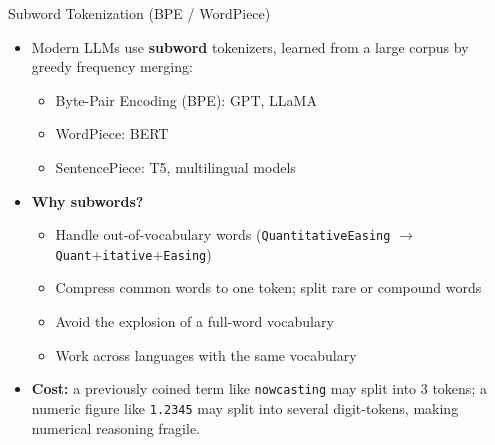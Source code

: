 \begin{frame}{Subword Tokenization (BPE / WordPiece)}
\begin{itemize}
\item Modern LLMs use \textbf{subword} tokenizers, learned from a large corpus by greedy frequency merging:
\begin{itemize}
    \item Byte-Pair Encoding (BPE): GPT, LLaMA
    \item WordPiece: BERT
    \item SentencePiece: T5, multilingual models
\end{itemize}

\medskip
\item \textbf{Why subwords?}
\begin{itemize}
    \item Handle out-of-vocabulary words (\texttt{QuantitativeEasing} $\rightarrow$ \texttt{Quant}+\texttt{itative}+\texttt{Easing})
    \item Compress common words to one token; split rare or compound words
    \item Avoid the explosion of a full-word vocabulary
    \item Work across languages with the same vocabulary
\end{itemize}

\medskip
\item \textbf{Cost:} a previously coined term like \texttt{nowcasting} may split into 3 tokens; a numeric figure like \texttt{1.2345} may split into several digit-tokens, making numerical reasoning fragile.
\end{itemize}
\end{frame}

